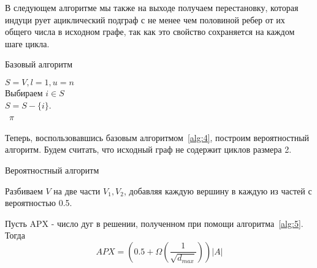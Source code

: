 В следующем алгоритме мы также на выходе получаем перестановку, которая индуци
рует ациклический подграф с не менее чем половиной ребер от их общего числа
в исходном графе, так как это свойство сохраняется на каждом шаге цикла.

\begin{algorithm}[hbt!]
    \caption{Базовый алгоритм}\label{alg:4}
        
        $S=V, l=1, u=n$ \\

         {
            Выбираем $i \in S$ \\
            $S = S - \{i\}$. \\
             
        }
        \Return~$\pi$
\end{algorithm}

Теперь, воспользовавшись базовым алгоритмом~\ref{alg:4}, построим вероятностный
алгоритм. Будем считать, что исходный граф не содержит циклов размера 2.

\begin{algorithm}[hbt!]
    \caption{Вероятностный алгоритм}\label{alg:5}
        Разбиваем $V$ на две части $V_1, V_2$, добавляя каждую вершину в каждую
        из частей с вероятностью 0.5. \\
         
\end{algorithm}

\newpage

\begin{theorem}
    Пусть APX - число дуг в решении, полученном при помощи 
    алгоритма~\ref{alg:5}. Тогда
    \[
        APX = \left( 0.5 + \Omega(\dfrac{1}{\sqrt{d_{max}}}) \right)|A|
    \]
\end{theorem}

